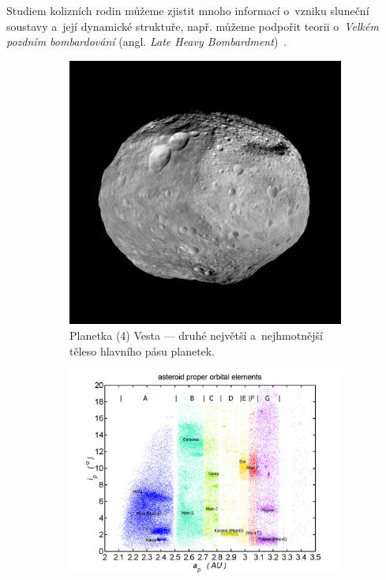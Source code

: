 \documentclass{beamer}
\newlength{\vyska}
\newlength{\vyskaA}
\newlength{\side}
\newlength{\main}
\newlength{\newparskip}
\begin{document}
\begin{frame}
\begin{columns}[t]
\begin{column}{\side}
\begin{tcolorbox}[title=Úvod\phantom{Úy},height=0.36\vyskaA,parbox=false]
		Studiem kolizních rodin můžeme zjistit mnoho informací o~vzniku sluneční soustavy a~její dynamické struktuře, např. můžeme podpořit teorii o~\textit{Velkém pozdním bombardování} (angl. \textit{Late Heavy Bombardment})~\cite{broz13}.%
		\begin{figure}[!htb]
			\begin{subfigure}[t]{0.42\textwidth}
			\centering
			\includegraphics[width=1.0\textwidth]{../obr/vesta.jpg}
			\caption{Planetka (4) Vesta --- druhé největší a~nejhmotnější těleso hlavního pásu planetek.} \label{fig:vesta}
			\end{subfigure}
			\begin{subfigure}[t]{0.56\textwidth}
			\centering
			\includegraphics[width=1.0\textwidth]{../obr/mainbelt.png}

\end{subfigure}
\end{figure}
\end{tcolorbox}
\end{column}
\end{columns}
\end{frame}
\end{document}
